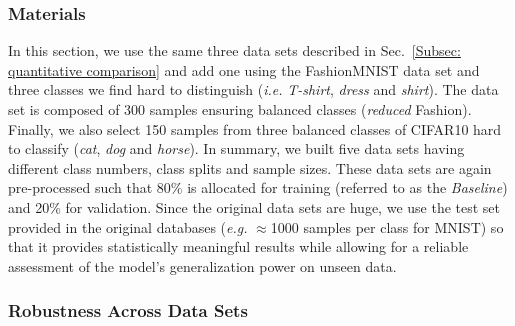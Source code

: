 \documentclass[10pt,journal,compsoc]{IEEEtran}
\begin{document}
\subsubsection{Materials}\label{Subsec: Toy materials}
In this section, we use the same three data sets described in Sec.~\ref{Subsec: quantitative comparison} and add one using the FashionMNIST data set and three classes we find hard to distinguish (\textit{i.e.} \emph{T-shirt}, \emph{dress} and \emph{shirt}). The data set is composed of 300 samples ensuring balanced classes (\textit{reduced} Fashion). Finally, we also select 150 samples from three balanced classes of CIFAR10 \cite{krizhevsky2009learning} hard to classify (\emph{cat}, \emph{dog} and \emph{horse}). In summary, we built five data sets having different class numbers, class splits and sample sizes. These data sets are again pre-processed such that 80\% is allocated for training (referred to as the \textit{Baseline}) and 20\% for validation. Since the original data sets are huge, we use the test set provided in the original databases (\emph{e.g.} $\approx$1000 samples per class for MNIST) so that it provides statistically meaningful results while allowing for a reliable assessment of the model's generalization power on unseen data.

\subsubsection{Robustness Across Data Sets}
\end{document}
